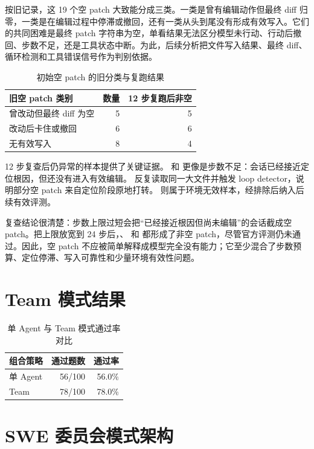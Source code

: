 \documentclass[UTF8,a4paper,11pt]{ctexart}
\begin{document}
按旧记录，这 19 个空 patch 大致能分成三类。一类是曾有编辑动作但最终 diff 归零，一类是在编辑过程中停滞或撤回，还有一类从头到尾没有形成有效写入。它们的共同困难是最终 patch 字符串为空，单看结果无法区分模型未行动、行动后撤回、步数不足，还是工具状态中断。为此，后续分析把文件写入结果、最终 diff、循环检测和工具错误信号作为判别依据。

\begin{table}[H]
\centering
\begin{tabular}{lrr}
\toprule
旧空 patch 类别 & 数量 & 12 步复跑后非空 \\
\midrule
曾改动但最终 diff 为空 & 5 & 5 \\
改动后卡住或撤回 & 6 & 6 \\
无有效写入 & 8 & 4 \\
\bottomrule
\end{tabular}
\caption{初始空 patch 的旧分类与复跑结果}
\end{table}

12 步复查后仍异常的样本提供了关键证据。 和  更像是步数不足：会话已经接近定位根因，但还没有进入有效编辑。 反复读取同一大文件并触发 loop detector，说明部分空 patch 来自定位阶段原地打转。 则属于环境无效样本，经排除后纳入后续有效评测。

复查结论很清楚：步数上限过短会把“已经接近根因但尚未编辑”的会话截成空 patch。把上限放宽到 24 步后，、 和  都形成了非空 patch，尽管官方评测仍未通过。因此，空 patch 不应被简单解释成模型完全没有能力；它至少混合了步数预算、定位停滞、写入可靠性和少量环境有效性问题。

\section{Team 模式结果}

\begin{table}[H]
\centering
\begin{tabular}{lrr}
\toprule
组合策略 & 通过题数 & 通过率 \\
\midrule
单 Agent & 56/100 & 56.0\% \\
Team & 78/100 & 78.0\% \\
\bottomrule
\end{tabular}
\caption{单 Agent 与 Team 模式通过率对比}
\end{table}

\section{SWE 委员会模式架构}
\end{document}
